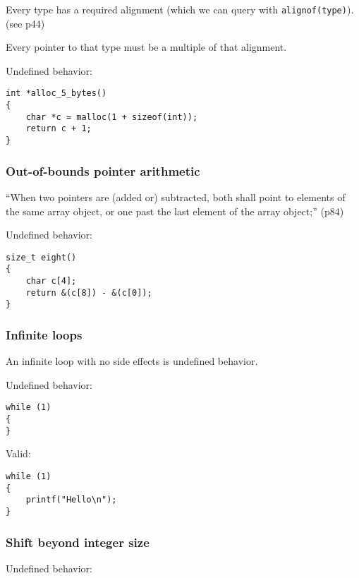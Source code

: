\documentclass[12pt]{article}
\begin{document}
Every type has a required alignment (which we can query with \texttt{alignof(type)}). (see p44)

Every pointer to that type must be a multiple of that alignment. 

Undefined behavior:

\begin{lstlisting}
int *alloc_5_bytes()
{
    char *c = malloc(1 + sizeof(int));
    return c + 1;
}
\end{lstlisting}

\subsubsection{Out-of-bounds pointer arithmetic}

“When two pointers are (added or) subtracted, 
both shall point to elements of the same array object, 
or one past the last element of the array object;” (p84)

Undefined behavior:

\begin{lstlisting}
size_t eight()
{
    char c[4];
    return &(c[8]) - &(c[0]);
}
\end{lstlisting}

\subsubsection{Infinite loops}

An infinite loop with no side effects is undefined behavior.

Undefined behavior:

\begin{lstlisting}
while (1)
{
}
\end{lstlisting}

Valid:

\begin{lstlisting}
while (1)
{
    printf("Hello\n");
}
\end{lstlisting}

\subsubsection{Shift beyond integer size}

Undefined behavior:
\end{document}
